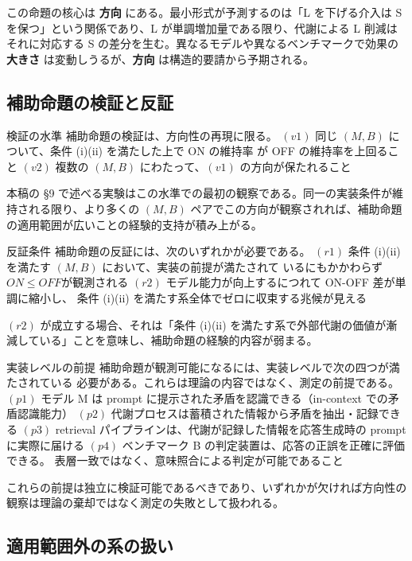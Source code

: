 \documentclass[12pt,a4paper]{article}
\begin{document}
この命題の核心は \textbf{方向} にある。最小形式が予測するのは「L を下げる介入は S を保つ」という関係であり、L が単調増加量である限り、代謝による L 削減はそれに対応する S の差分を生む。異なるモデルや異なるベンチマークで効果の \textbf{大きさ} は変動しうるが、\textbf{方向} は構造的要請から予期される。

\subsection{補助命題の検証と反証}\label{ux88dcux52a9ux547dux984cux306eux691cux8a3cux3068ux53cdux8a3c}

検証の水準 補助命題の検証は、方向性の再現に限る。 \((v1)\) 同じ \((M, B)\) について、条件 (i)(ii) を満たした上で ON の維持率 が OFF の維持率を上回ること \((v2)\) 複数の \((M, B)\) にわたって、\((v1)\) の方向が保たれること

本稿の §9 で述べる実験はこの水準での最初の観察である。同一の実装条件が維持される限り、より多くの \((M, B)\) ペアでこの方向が観察されれば、補助命題の適用範囲が広いことの経験的支持が積み上がる。

反証条件 補助命題の反証には、次のいずれかが必要である。 \((r1)\) 条件 (i)(ii) を満たす \((M, B)\) において、実装の前提が満たされて いるにもかかわらず \(ON \le OFF\)が観測される \((r2)\) モデル能力が向上するにつれて ON-OFF 差が単調に縮小し、 条件 (i)(ii) を満たす系全体でゼロに収束する兆候が見える

\((r2)\) が成立する場合、それは「条件 (i)(ii) を満たす系で外部代謝の価値が漸減している」ことを意味し、補助命題の経験的内容が弱まる。

実装レベルの前提 補助命題が観測可能になるには、実装レベルで次の四つが満たされている 必要がある。これらは理論の内容ではなく、測定の前提である。 \((p1)\) モデル M は prompt に提示された矛盾を認識できる（in-context での矛盾認識能力） \((p2)\) 代謝プロセスは蓄積された情報から矛盾を抽出・記録できる \((p3)\) retrieval パイプラインは、代謝が記録した情報を応答生成時の prompt に実際に届ける \((p4)\) ベンチマーク B の判定装置は、応答の正誤を正確に評価できる。 表層一致ではなく、意味照合による判定が可能であること

これらの前提は独立に検証可能であるべきであり、いずれかが欠ければ方向性の観察は理論の棄却ではなく測定の失敗として扱われる。

\subsection{適用範囲外の系の扱い}\label{ux9069ux7528ux7bc4ux56f2ux5916ux306eux7cfbux306eux6271ux3044}
\end{document}
